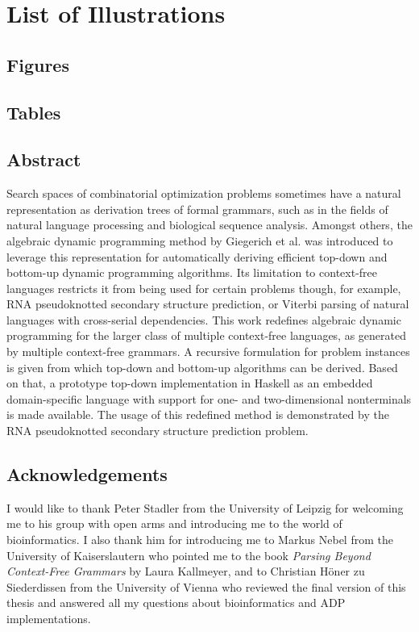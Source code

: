 \documentclass[
    a4paper,
    12pt,
    twoside,
    BCOR=12mm,
    parskip=half,
    chapterprefix,
    numbers=noenddot,
    bibliography=totoc
]{scrbook}
\makeatletter
\newcommand\listofillustrations{%
    \begingroup
    \setlength{\parskip}{0pt}%
    \chapter*{List of Illustrations}%
    \section*{Figures}%
    \@starttoc{lof}%
    \bigskip
    \section*{Tables}%
    \@starttoc{lot}%
    \endgroup}
\makeatother
\begin{document}
\frontmatter



\cleardoublepage
\setcounter{tocdepth}{1}
\tableofcontents
\listofillustrations

\renewcommand{\lstlistlistingname}{Code Listings}
\lstlistoflistings


\cleardoublepage
\thispagestyle{empty} 
\section*{Abstract}

Search spaces of combinatorial optimization problems sometimes have a natural representation as derivation trees of formal grammars, such as in the fields of natural language processing and biological sequence analysis.
Amongst others, the algebraic dynamic programming method by Giegerich et al. was introduced to leverage this representation for automatically deriving efficient top-down and bottom-up dynamic programming algorithms. Its limitation to context-free languages restricts it from being used for certain problems though, for example, RNA pseudoknotted secondary structure prediction, or Viterbi parsing of natural languages with cross-serial dependencies.
This work redefines algebraic dynamic programming for the larger class of multiple context-free languages, as generated by multiple context-free grammars. A recursive formulation for problem instances is given from which top-down and bottom-up algorithms can be derived. Based on that, a prototype top-down implementation in Haskell as an embedded domain-specific language with support for one- and two-dimensional nonterminals is made available.
The usage of this redefined method is demonstrated by the RNA pseudoknotted secondary structure prediction problem.

\cleardoublepage
\thispagestyle{empty} 
\section*{Acknowledgements}

I would like to thank Peter Stadler from the University of Leipzig for welcoming me to his group with open arms and introducing me to the world of bioinformatics. I also thank him for introducing me to Markus Nebel from the University of Kaiserslautern who pointed me to the book \emph{Parsing Beyond Context-Free Grammars} by Laura Kallmeyer, and to Christian Höner zu Siederdissen from the University of Vienna who reviewed the final version of this thesis and answered all my questions about bioinformatics and ADP implementations.
\end{document}
